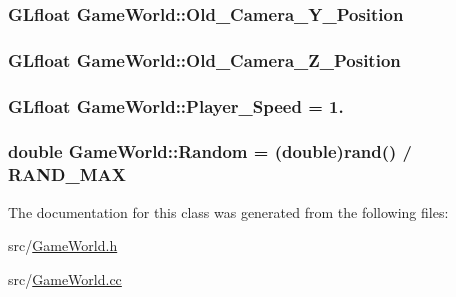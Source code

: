 \subsubsection[{Old\+\_\+\+Camera\+\_\+\+Y\+\_\+\+Position}]{\setlength{\rightskip}{0pt plus 5cm}G\+Lfloat Game\+World\+::\+Old\+\_\+\+Camera\+\_\+\+Y\+\_\+\+Position}\label{class_game_world_ac1c9de2db7cb175f7a039a9f825190fc}
\hypertarget{class_game_world_acf69fc81410f4bb31d03b7551eb0bced}{}
\subsubsection[{Old\+\_\+\+Camera\+\_\+\+Z\+\_\+\+Position}]{\setlength{\rightskip}{0pt plus 5cm}G\+Lfloat Game\+World\+::\+Old\+\_\+\+Camera\+\_\+\+Z\+\_\+\+Position}\label{class_game_world_acf69fc81410f4bb31d03b7551eb0bced}
\hypertarget{class_game_world_ae8ab2ac372729cec44ea316f6bdf45ca}{}
\subsubsection[{Player\+\_\+\+Speed}]{\setlength{\rightskip}{0pt plus 5cm}G\+Lfloat Game\+World\+::\+Player\+\_\+\+Speed = 1.}\label{class_game_world_ae8ab2ac372729cec44ea316f6bdf45ca}
\hypertarget{class_game_world_a56652cc9880b3ba1be61395066c863c3}{}
\subsubsection[{Random}]{\setlength{\rightskip}{0pt plus 5cm}double Game\+World\+::\+Random = (double)rand() / R\+A\+N\+D\+\_\+\+M\+A\+X}\label{class_game_world_a56652cc9880b3ba1be61395066c863c3}


The documentation for this class was generated from the following files\+:\begin{DoxyCompactItemize}
\item 
src/\hyperlink{_game_world_8h}{Game\+World.\+h}\item 
src/\hyperlink{_game_world_8cc}{Game\+World.\+cc}\end{DoxyCompactItemize}
